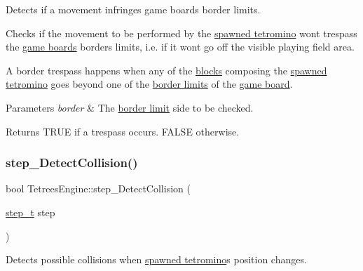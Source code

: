 Detects if a movement infringes game board\textquotesingle{}s border limits. 

Checks if the movement to be performed by the \hyperlink{classTetreesEngine_a26435ee2f02d9ba70d9e359745114f6e}{spawned tetromino} won\textquotesingle{}t trespass the \hyperlink{classTetreesEngine_a37d082a7816d6731b2703dd6d1a1cb97}{game board\textquotesingle{}s} borders limits, i.\+e. if it won\textquotesingle{}t go off the visible playing field area.

A border trespass happens when any of the \hyperlink{TetreesDefs_8hpp_ad8f0654cf997b7ea7eb14924d0b1ea33}{blocks} composing the \hyperlink{classTetreesEngine_a26435ee2f02d9ba70d9e359745114f6e}{spawned tetromino} goes beyond one of the \hyperlink{TetreesDefs_8hpp_a5dbb1ebfe8a9b95707ac161d3549ed8a}{border limits} of the \hyperlink{classTetreesEngine_a37d082a7816d6731b2703dd6d1a1cb97}{game board}. 
\begin{DoxyParams}{Parameters}
{\em border} & The \hyperlink{TetreesDefs_8hpp_a5dbb1ebfe8a9b95707ac161d3549ed8a}{border limit} side to be checked. \\
\hline
\end{DoxyParams}
\begin{DoxyReturn}{Returns}
{\ttfamily T\+R\+UE} if a trespass occurs. {\ttfamily F\+A\+L\+SE} otherwise. 
\end{DoxyReturn}
\mbox{\label{classTetreesEngine_a25f8b896240ce2d2a34b1d968e75b5b6}} 
\subsubsection{\texorpdfstring{step\+\_\+\+Detect\+Collision()}{step\_DetectCollision()}}
{\footnotesize\ttfamily bool Tetrees\+Engine\+::step\+\_\+\+Detect\+Collision (\begin{DoxyParamCaption}\item[{\hyperlink{TetreesDefs_8hpp_a4d5a793092a473f85b4c1f7faf62afed}{step\+\_\+t}}]{step }\end{DoxyParamCaption})\hspace{0.3cm}{\ttfamily [private]}}



Detects possible collisions when \hyperlink{classTetreesEngine_a26435ee2f02d9ba70d9e359745114f6e}{spawned tetromino}\textquotesingle{}s position changes. 

